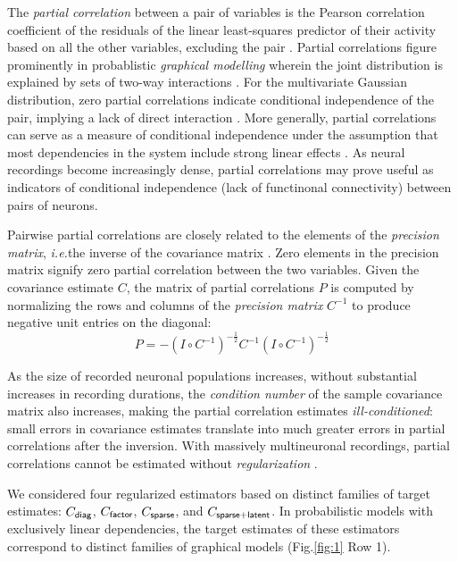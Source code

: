 \documentclass[10pt]{article}
\newcommand{\figref}[2]{Fig.\;\ref{fig:#1}\,#2}
\newcommand{\ie}{\emph{i.e.}\;}
\begin{document}
The \emph{partial correlation} between a pair of variables is the Pearson correlation coefficient of the residuals of the linear least-squares predictor of their activity based on all the other variables, excluding the pair \cite{Anderson:2003, Whittaker:1990}. Partial correlations figure prominently in probablistic \emph{graphical modelling} wherein the joint distribution is explained by sets of two-way interactions \cite{Whittaker:1990}. For the multivariate Gaussian distribution, zero partial correlations indicate conditional independence of the pair, implying a lack of direct interaction \cite{Dempster:1972, Whittaker:1990}. More generally, partial correlations can serve as a measure of conditional independence under the assumption that most dependencies in the system include strong linear effects \cite{Whittaker:1990,Baba:2004}. As neural recordings become increasingly dense, partial correlations may prove useful as indicators of conditional independence (lack of functinonal connectivity) between pairs of neurons.

Pairwise partial correlations are closely related to the elements of the \emph{precision matrix}, \ie the inverse of the covariance matrix \cite{Dempster:1972,Whittaker:1990}. Zero elements in the precision matrix signify zero partial correlation between the two variables. Given the covariance estimate $C$, the matrix of partial correlations $P$ is computed by normalizing the rows and columns of the \emph{precision matrix} $C^{-1}$ to produce negative unit entries on the diagonal:
\begin{equation}\label{eq:partial}
    P = -\left(I\circ C^{-1}\right)^{-\frac 1 2} C^{-1} \left(I\circ C^{-1}\right)^{-\frac 1 2}
\end{equation}

As the size of recorded neuronal populations increases, without substantial increases in recording durations, the \emph{condition number} of the sample covariance matrix also increases, making the partial correlation estimates \emph{ill-conditioned}: small errors in covariance estimates translate into much greater errors in partial correlations after the inversion. With massively multineuronal recordings, partial correlations cannot be estimated without \emph{regularization} \cite{Ledoit:2004,Schafer:2005}.

We considered four regularized estimators based on distinct families of target estimates: $C_{\sf diag}$, $C_{\sf factor}$, $C_{\sf sparse}$, and $C_{\sf sparse+latent}$. In probabilistic models with exclusively linear dependencies, the target estimates of these estimators correspond to distinct families of graphical models (\figref{1}{\,Row 1}).  
\end{document}
